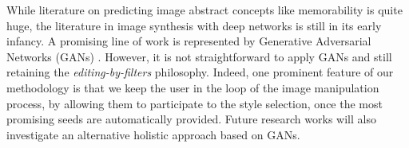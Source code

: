\documentclass{sig-alternate-05-2015}
\begin{document}
While literature on predicting image abstract concepts like memorability is quite huge, the literature in image synthesis with deep networks is still in its early infancy.
A promising line of work is represented by Generative Adversarial Networks (GANs) \cite{goodfellow2014generative}. %
However, it is not straightforward to apply GANs and still retaining the \emph{editing-by-filters} philosophy. Indeed, one prominent feature of our methodology is that we keep the user in the loop of the image manipulation process, %
by allowing them to participate to the style selection, once the most promising seeds are automatically provided. 
Future research works will also investigate an alternative holistic approach based on GANs.
\end{document}
